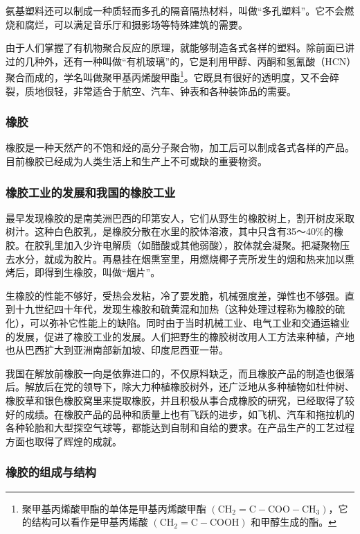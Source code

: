 氨基塑料还可以制成一种质轻而多孔的隔音隔热材料，叫做``多孔塑料''。它不会燃烧和腐烂，可以满足音乐厅和摄影场等特殊建筑的需要。

由于人们掌握了有机物聚合反应的原理，就能够制造各式各样的塑料。除前面已讲过的几种外，还有一种叫做``有机玻璃''的，它是利用甲醇、丙酮和氢氰酸（HCN）聚合而成的，学名叫做聚甲基丙烯酸甲酯\footnote{聚甲基丙烯酸甲酯的单体是甲基丙烯酸甲酯
  \(\left(\mathrm{CH}_{2}=\mathrm{C}-\mathrm{COO}-\mathrm{CH}_{3}\right)\)，它的结构可以看作是甲基丙烯酸
  \(\left(\mathrm{CH}_{2}=\mathrm{C}-\mathrm{COOH}\right)\)
  和甲醇生成的酯。}。它既具有很好的透明度，又不会碎裂，质地很轻，非常适合于航空、汽车、钟表和各种装饰品的需要。

\subsubsection{橡胶}

橡胶是一种天然产的不饱和烃的高分子聚合物，加工后可以制成各式各样的产品。目前橡胶已经成为人类生活上和生产上不可或缺的重要物资。

\subsubsection{橡胶工业的发展和我国的橡胶工业}

最早发现橡胶的是南美洲巴西的印第安人，它们从野生的橡胶树上，割开树皮采取树汁。这种白色胶乳，是橡胶分散在水里的胶体溶液，其中只含有35～40\%的橡胶。在胶乳里加入少许电解质（如醋酸或其他弱酸），胶体就会凝聚。把凝聚物压去水分，就成为胶片。再悬挂在烟熏室里，用燃烧椰子壳所发生的烟和热来加以熏烤后，即得到生橡胶，叫做``烟片''。

生橡胶的性能不够好，受热会发粘，冷了要发脆，机械强度差，弹性也不够强。直到十九世纪四十年代，发现生橡胶和硫黄混和加热（这种处理过程称为橡胶的硫化），可以弥补它性能上的缺陷。同时由于当时机械工业、电气工业和交通运输业的发展，促进了橡胶工业的发展。人们把野生的橡胶树改用人工方法来种植，产地也从巴西扩大到亚洲南部新加坡、印度尼西亚一带。

我国在解放前橡胶一向是依靠进口的，不仅原料缺乏，而且橡胶产品的制造也很落后。解放后在党的领导下，除大力种植橡胶树外，还广泛地从多种植物如杜仲树、橡胶草和银色橡胶窝里来提取橡胶，并且积极从事合成橡胶的研究，已经取得了较好的成绩。在橡胶产品的品种和质量上也有飞跃的进步，如飞机、汽车和拖拉机的各种轮胎和大型探空气球等，都能达到自制和自给的要求。在产品生产的工艺过程方面也取得了辉煌的成就。

\subsubsection{橡胶的组成与结构}

